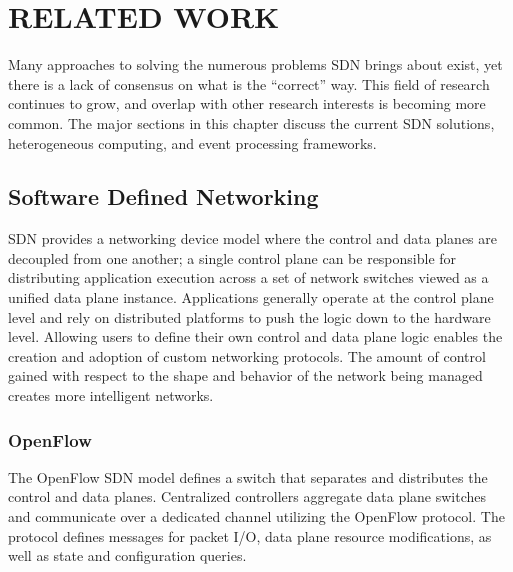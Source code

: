 \chapter{RELATED WORK}
\label{related}
Many
approaches to solving the numerous problems SDN brings about exist, yet there
is a lack of consensus on what is the ``correct'' way. This field of research
continues to grow, and overlap with other research interests is becoming more
common. The major sections in this chapter discuss the current SDN solutions,
heterogeneous computing, and event processing frameworks.

\section{Software Defined Networking}
\label{related:sdn}
SDN provides a networking device model where the control and data planes are
decoupled from one another; a single control plane can be responsible for
distributing application execution across a set of network switches viewed as
a unified data plane instance. Applications generally operate at the control
plane level and rely on distributed platforms to push the logic down to the
hardware level. Allowing users to define their own control and data plane
logic enables the creation and adoption of custom networking protocols. The
amount of control gained with respect to the shape and behavior of the network
being managed creates more intelligent networks.


\subsection{OpenFlow}
\label{related:of}
The OpenFlow \cite{openflow} SDN model defines a switch that separates and
distributes the control and data planes. Centralized controllers aggregate
data plane switches and communicate over a dedicated channel utilizing the
OpenFlow protocol. The protocol defines messages for packet I/O, data plane
resource modifications, as well as state and configuration queries.

